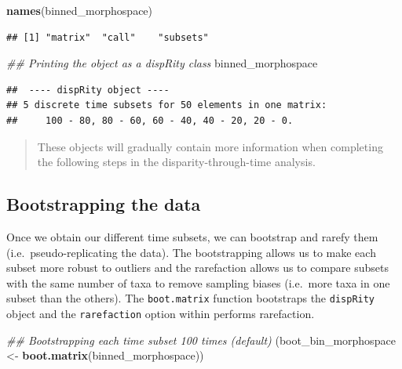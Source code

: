 \documentclass[]{book}
\newenvironment{Shaded}{\begin{snugshade}}{\end{snugshade}}
\newcommand{\CommentTok}[1]{\textcolor[rgb]{0.56,0.35,0.01}{\textit{#1}}}
\newcommand{\KeywordTok}[1]{\textcolor[rgb]{0.13,0.29,0.53}{\textbf{#1}}}
\newcommand{\NormalTok}[1]{#1}
\newcommand{\StringTok}[1]{\textcolor[rgb]{0.31,0.60,0.02}{#1}}
\begin{document}
\begin{Shaded}
\begin{Highlighting}[]
\KeywordTok{names}\NormalTok{(binned_morphospace)}
\end{Highlighting}
\end{Shaded}

\begin{verbatim}
## [1] "matrix"  "call"    "subsets"
\end{verbatim}

\begin{Shaded}
\begin{Highlighting}[]
\CommentTok{## Printing the object as a dispRity class}
\NormalTok{binned_morphospace}
\end{Highlighting}
\end{Shaded}

\begin{verbatim}
##  ---- dispRity object ---- 
## 5 discrete time subsets for 50 elements in one matrix:
##     100 - 80, 80 - 60, 60 - 40, 40 - 20, 20 - 0.
\end{verbatim}

\begin{quote}
These objects will gradually contain more information when completing the following steps in the disparity-through-time analysis.
\end{quote}

\hypertarget{bootstrapping-the-data-1}{%
\subsection{Bootstrapping the data}\label{bootstrapping-the-data-1}}

Once we obtain our different time subsets, we can bootstrap and rarefy them (i.e.~pseudo-replicating the data).
The bootstrapping allows us to make each subset more robust to outliers and the rarefaction allows us to compare subsets with the same number of taxa to remove sampling biases (i.e.~more taxa in one subset than the others).
The \texttt{boot.matrix} function bootstraps the \texttt{dispRity} object and the \texttt{rarefaction} option within performs rarefaction.

\begin{Shaded}
\begin{Highlighting}[]
\CommentTok{## Bootstrapping each time subset 100 times (default)}
\NormalTok{(boot_bin_morphospace <-}\StringTok{ }\KeywordTok{boot.matrix}\NormalTok{(binned_morphospace))}
\end{Highlighting}
\end{Shaded}
\end{document}
